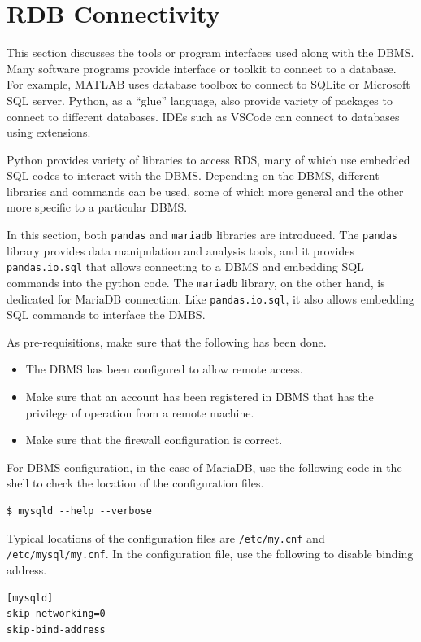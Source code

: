 \section{RDB Connectivity}

This section discusses the tools or program interfaces used along with the DBMS. Many software programs provide interface or toolkit to connect to a database. For example, MATLAB uses database toolbox to connect to SQLite or Microsoft SQL server. Python, as a ``glue'' language, also provide variety of packages to connect to different databases. IDEs such as VSCode can connect to databases using extensions.

Python provides variety of libraries to access RDS, many of which use embedded SQL codes to interact with the DBMS. Depending on the DBMS, different libraries and commands can be used, some of which more general and the other more specific to a particular DBMS.

In this section, both \verb|pandas| and \verb|mariadb| libraries are introduced. The \verb|pandas| library provides data manipulation and analysis tools, and it provides \verb|pandas.io.sql| that allows connecting to a DBMS and embedding SQL commands into the python code. The \verb|mariadb| library, on the other hand, is dedicated for MariaDB connection. Like \verb|pandas.io.sql|, it also allows embedding SQL commands to interface the DMBS.

As pre-requisitions, make sure that the following has been done.
\begin{itemize}
	\item The DBMS has been configured to allow remote access.
	\item Make sure that an account has been registered in DBMS that has the privilege of operation from a remote machine.
	\item Make sure that the firewall configuration is correct.
\end{itemize}

For DBMS configuration, in the case of MariaDB, use the following code in the shell to check the location of the configuration files.
\begin{lstlisting}
$ mysqld --help --verbose
\end{lstlisting}
Typical locations of the configuration files are \verb|/etc/my.cnf| and \verb|/etc/mysql/my.cnf|. In the configuration file, use the following to disable binding address.
\begin{lstlisting}
[mysqld]
skip-networking=0
skip-bind-address
\end{lstlisting}

